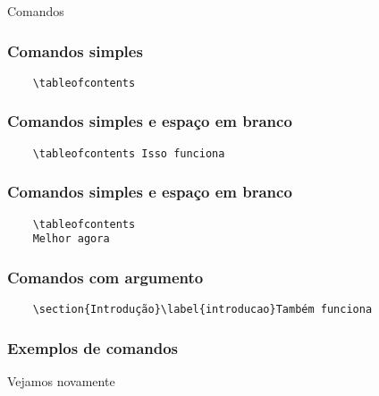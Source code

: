 \begin{frame}[standout]
  \Huge
  Comandos
\end{frame}

\begin{frame}[fragile]
  \frametitle{Comandos simples}
  \begin{verbatim}
    \tableofcontents
  \end{verbatim}
\end{frame}

\begin{frame}[fragile]
  \frametitle{Comandos simples e espaço em branco}
  \begin{verbatim}
    \tableofcontents Isso funciona
  \end{verbatim}
\end{frame}

\begin{frame}[fragile]
  \frametitle{Comandos simples e espaço em branco}
  \begin{verbatim}
    \tableofcontents
    Melhor agora
  \end{verbatim}
\end{frame}

\begin{frame}[fragile]
  \frametitle{Comandos com argumento}
  \begin{verbatim}
    \section{Introdução}\label{introducao}Também funciona
  \end{verbatim}
\end{frame}

\begin{frame}
  \frametitle{Exemplos de comandos}
  \huge
  Vejamos  novamente
\end{frame}
